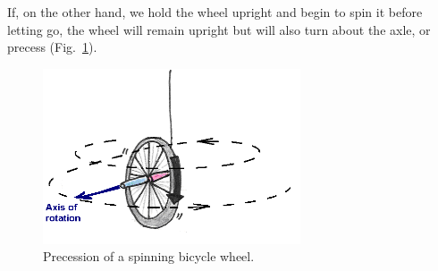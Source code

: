If, on the other hand, we hold the wheel upright and begin to spin it before letting go, the wheel will remain upright but will also turn about the axle, or precess (Fig.~\ref{Fig9-17}).  
\begin{figure}[h]
	\centering
	\includegraphics[width=3.0in]{./figures/Topic9/Fig9-17.png}
	\caption{Precession of a spinning bicycle wheel.}
 	\label{Fig9-17}
\end{figure} 

